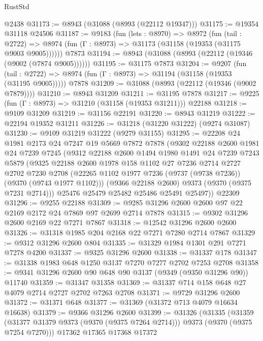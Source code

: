 \begin{lexlean}{RustStd}
\begin{coremodule}
    @2438
@31173 := @8943 (@31088 (@8993 (@22112 @19347)))
@31175 := @19354 @31118 @24506
@31187 := @9183
    (fun (lets : @8970) =>
    @8972
      (fun (tail : @2722) =>
      @8974 (fun (Γ : @8973) => @31173 (@31158 (@19353 (@31175 @9003 @9005))))))
    @7873
@31194 := @8943 (@31088 (@8993 (@22112 (@19346 (@9002 (@7874 @9005))))))
@31195 := @31175 @7873
@31204 := @9207
    (fun (tail : @2722) => @8974 (fun (Γ : @8973) => @31194 (@31158 (@19353 (@31195 @9005)))))
    @7878
@31209 := @31088 (@8993 (@22112 (@19346 (@9002 @7879))))
@31210 := @8943 @31209
@31211 := @31195 @7878
@31217 := @9225 (fun (Γ : @8973) => @31210 (@31158 (@19353 @31211))) @22188
@31218 := @9109 @31209
@31219 := @31156 @22191
@31220 := @8943 @31219
@31222 := @22194 @19352 @31211
@31226 := @31218 (@31220 @31222) (@9274 @31087)
@31230 := @9109 @31219 @31222 (@9279 @31155)
@31295 := @22208
    @24
    @1981
    @2173
    @24
    @7247
    @19
    @5669
    @7872
    @7878
    (@9302
      @22188
      @2600
      @1981
      @24
      @7239
      @7245
      (@9312
        @22188
        @2600
        @1494
        @1980
        @1491
        @24
        @7239
        @7243
        @5879
        (@9325
          @22188
          @2600
          @1978
          @158
          @1102
          @27
          @7236
          @2714
          @2727
          @2702
          @7230
          @2708
          (@22265 @1102 @1977 @7236 (@9737 (@9738 @7236)) (@9370 (@9743 @1977 @1102)))
          (@9366 @22188 @2600)
          @9373
          (@9370 (@9375 @7231 @2714)))
        @25476
        @25479
        @25482
        @25486
        @25491
        @25497))
    @22309
@31296 := @9255 @22188
@31309 := @9285 @31296 @2600 @2600 @97 @22 @2169 @2172 @24 @7869 @97 @2699 @2714 @7878
@31315 := @9302 @31296 @2600 @2169 @22 @7271 @7867
@31318 := @12542 @31296 @2600 @2600
@31326 := @31318 @1985 @204 @2168 @22 @7271 @7280 @2714 @7867
@31329 := @9312 @31296 @2600 @804
@31335 := @31329 @1984 @1301 @291 @7271 @7278 @4200
@31337 := @9325 @31296 @2600
@31338 := @31337 @178
@31347 := @31338 @1983 @648 @1250 @3137 @7270 @7277 @2702 @7253 @2708
@31358 := @9341 @31296 @2600 @90 @648 @90 @3137 (@9349 (@9350 @31296 @90)) @11740
@31359 := @31347 @31358
@31369 := @31337 @714 @158 @648 @27 @4079 @2714 @2727 @2702 @7263 @2708
@31371 := @9729 @31296 @2600
@31372 := @31371 @648
@31377 := @31369 (@31372 @713 @4079 @16634 @16638)
@31379 := @9366 @31296 @2600
@31399 := @31326
    (@31335
      (@31359 (@31377 @31379 @9373 (@9370 (@9375 @7264 @2714))) @9373 (@9370 (@9375 @7254 @7270)))
      @17362
      @17365
      @17368
      @17372

\end{coremodule}
\end{lexlean}
